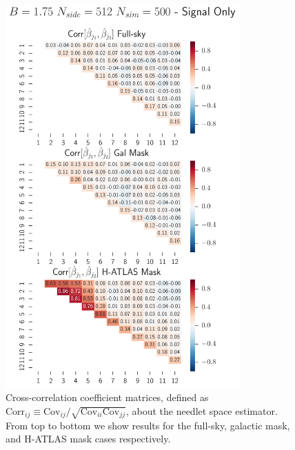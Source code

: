\documentclass[a4paper,11pt]{article}
\begin{document}
\begin{figure}[tbp]
\centering %
\includegraphics[width=0.8\textwidth]{images/corr_val_needlet_nside512_nsim500_jmax12.pdf}
\caption{\label{fig:needsims_corr} Cross-correlation coefficient matrices, defined as $\text{Corr}_{ij} \equiv \text{Cov}_{ij}/\sqrt{\text{Cov}_{ii}\text{Cov}_{jj}}$, about the needlet space 
estimator. From top to bottom we show results for the full-sky, galactic mask, and H-ATLAS mask
cases respectively. }
\end{figure}
%


{}
\end{document}

